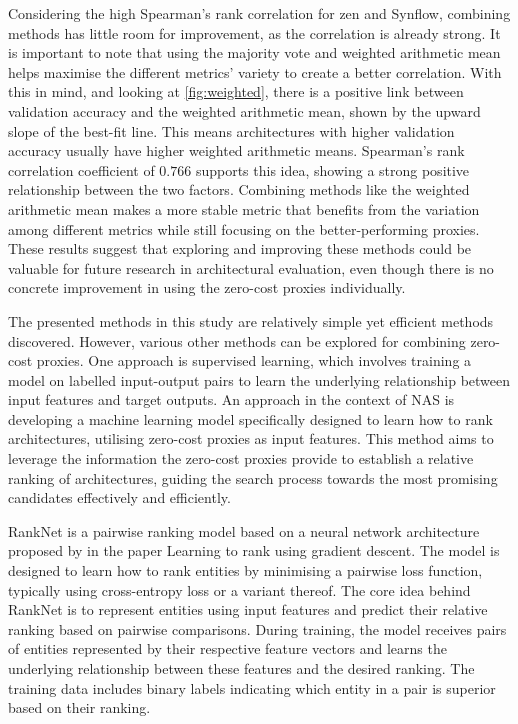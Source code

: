 Considering the high Spearman's rank correlation for zen and \gls{Synflow}, combining methods has little room for improvement, as the correlation is already strong. It is important to note that using the majority vote and weighted arithmetic mean helps maximise the different metrics' variety to create a better correlation. With this in mind, and looking at \cref{fig:weighted}, there is a positive link between validation accuracy and the weighted arithmetic mean, shown by the upward slope of the best-fit line. This means architectures with higher validation accuracy usually have higher weighted arithmetic means. Spearman's rank correlation coefficient of $0.766$ supports this idea, showing a strong positive relationship between the two factors. Combining methods like the weighted arithmetic mean makes a more stable metric that benefits from the variation among different metrics while still focusing on the better-performing proxies. These results suggest that exploring and improving these methods could be valuable for future research in architectural evaluation, even though there is no concrete improvement in using the zero-cost proxies individually. 

The presented methods in this study are relatively simple yet efficient methods discovered. However, various other methods can be explored for combining zero-cost proxies. One approach is supervised learning,  which involves training a model on labelled input-output pairs to learn the underlying relationship between input features and target outputs. An approach in the context of \gls{NAS} is developing a machine learning model specifically designed to learn how to rank architectures, utilising zero-cost proxies as input features. This method aims to leverage the information the zero-cost proxies provide to establish a relative ranking of architectures, guiding the search process towards the most promising candidates effectively and efficiently. 

RankNet is a pairwise ranking model based on a neural network architecture proposed by \cite{burges2005learning} in the paper Learning to rank using gradient descent. The model is designed to learn how to rank entities by minimising a pairwise loss function, typically using cross-entropy loss or a variant thereof. The core idea behind RankNet is to represent entities using input features and predict their relative ranking based on pairwise comparisons. During training, the model receives pairs of entities represented by their respective feature vectors and learns the underlying relationship between these features and the desired ranking. The training data includes binary labels indicating which entity in a pair is superior based on their ranking.

